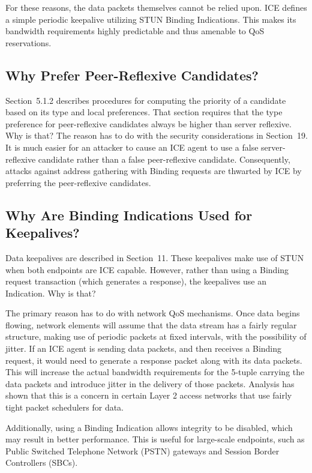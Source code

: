 \documentclass{article}
\begin{document}
For these reasons, the data packets themselves cannot be relied upon. ICE defines a simple periodic keepalive utilizing STUN Binding Indications.  This makes its bandwidth requirements highly predictable and thus amenable to QoS reservations.

\subsection{Why Prefer Peer-Reflexive Candidates?}

Section~5.1.2 describes procedures for computing the priority of a candidate based on its type and local preferences.  That section requires that the type preference for peer-reflexive candidates always be higher than server reflexive.  Why is that?  The reason has to do with the security considerations in Section~19.  It is much easier for an attacker to cause an ICE agent to use a false server- reflexive candidate rather than a false peer-reflexive candidate. Consequently, attacks against address gathering with Binding requests are thwarted by ICE by preferring the peer-reflexive candidates.

\subsection{Why Are Binding Indications Used for Keepalives?}

Data keepalives are described in Section~11.  These keepalives make use of STUN when both endpoints are ICE capable.  However, rather than using a Binding request transaction (which generates a response), the keepalives use an Indication.  Why is that?

The primary reason has to do with network QoS mechanisms.  Once data begins flowing, network elements will assume that the data stream has a fairly regular structure, making use of periodic packets at fixed intervals, with the possibility of jitter.  If an ICE agent is sending data packets, and then receives a Binding request, it would need to generate a response packet along with its data packets.  This will increase the actual bandwidth requirements for the 5-tuple carrying the data packets and introduce jitter in the delivery of those packets.  Analysis has shown that this is a concern in certain Layer 2 access networks that use fairly tight packet schedulers for data.

Additionally, using a Binding Indication allows integrity to be disabled, which may result in better performance.  This is useful for large-scale endpoints, such as Public Switched Telephone Network (PSTN) gateways and Session Border Controllers (SBCs).
\end{document}
